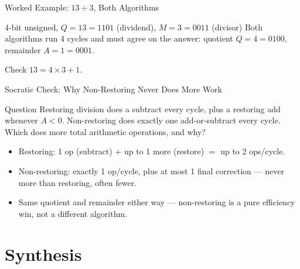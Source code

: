 \documentclass[aspectratio=169]{beamer}
\begin{document}
\begin{frame}{Worked Example: $13 \div 3$, Both Algorithms}
  \begin{block}{4-bit unsigned, $Q=13=1101$ (dividend), $M=3=0011$ (divisor)}
    Both algorithms run 4 cycles and must agree on the answer:
    quotient $Q=4=0100$, remainder $A=1=0001$.
  \end{block}
  \begin{exampleblock}{Check}
    $13 = 4\times 3 + 1$. 
  \end{exampleblock}
  \vspace{0.2cm}
\end{frame}

\begin{frame}{Socratic Check: Why Non-Restoring Never Does More Work}
  \begin{alertblock}{Question}
    Restoring division does a subtract every cycle, plus a restoring add
    whenever $A<0$. Non-restoring does exactly one add-or-subtract every
    cycle. Which does more total arithmetic operations, and why?
  \end{alertblock}
  \begin{itemize}
    \item Restoring: 1 op (subtract) $+$ up to 1 more (restore) $=$ up to 2
      ops/cycle.
    \item Non-restoring: exactly 1 op/cycle, plus at most 1 final correction
      --- never more than restoring, often fewer.
    \item Same quotient and remainder either way --- non-restoring is a pure
      efficiency win, not a different algorithm.
  \end{itemize}
\end{frame}


\section{Synthesis}
\end{document}
